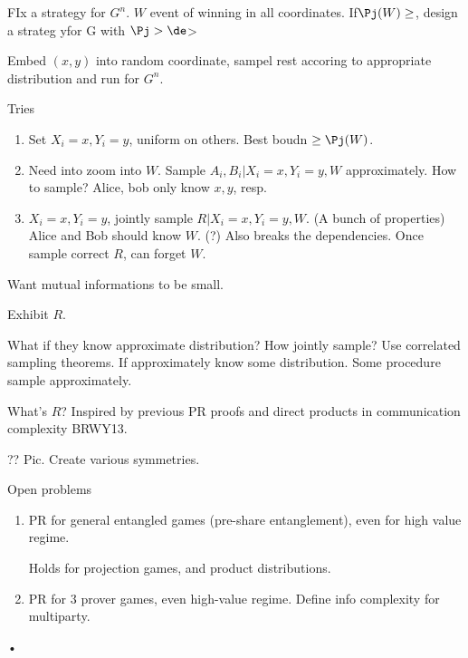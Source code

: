 FIx a strategy for $G^n$. $W$ event of winning in all coordinates. If$\Pj(W)\ge$, design a strateg yfor G with $\Pj>\de$> 

Embed $(x,y)$ into random coordinate, sampel rest accoring to appropriate distribution and run for $G^n$.

Tries
\begin{enumerate}
\item
Set $X_i=x,Y_i=y$, uniform on others. Best boudn $\ge \Pj(W)$.
\item
Need into zoom into $W$. Sample $A_i,B_i|X_i=x,Y_i=y,W$ approximately. How to sample? Alice, bob only know $x,y$, resp.
\item
$X_i=x,Y_i=y$, jointly sample $R|X_i=x,Y_i=y,W$. (A bunch of properties) Alice and Bob should know $W$. (?) Also breaks the dependencies. Once sample correct $R$, can forget $W$. 
\end{enumerate}

Want mutual informations to be small. 

Exhibit $R$.

What if they know approximate distribution? How jointly sample? Use correlated sampling theorems. If approximately know some distribution. Some procedure sample approximately. 

What's $R$? Inspired by previous PR proofs and direct products in communication complexity BRWY13. 

?? Pic. Create various symmetries.


Open problems
\begin{enumerate}
\item
PR for general entangled games (pre-share entanglement), even for high value regime.

Holds for projection games, and product distributions.
\item
PR for 3 prover games, even high-value regime.
Define info complexity for multiparty.
\end{enumerate}•